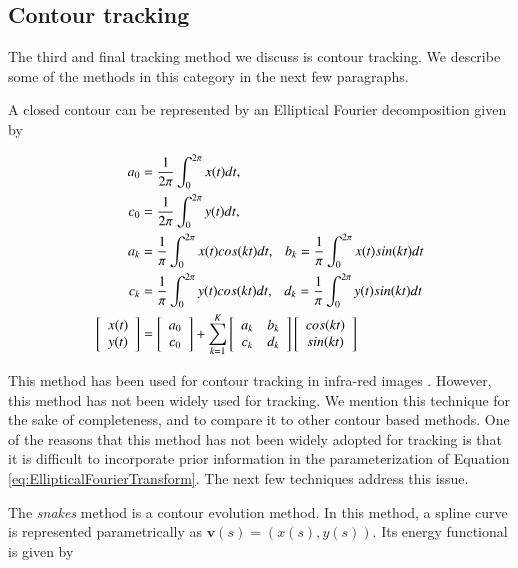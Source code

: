 \begin{Body}
\subsection{Contour tracking}
The third and final tracking method we discuss is contour tracking.  We describe some of the methods in this category in the next few paragraphs.

A closed contour can be represented by an Elliptical Fourier decomposition \cite{1982_JNL_EllipticalFourier_Kuhl} given by

\begin{align}
\centering
	\label{eq:EllipticalFourierTransform}
	a_0&=\frac{1}{2\pi}\int_0^{2 \pi}x(t)dt,       \notag\\ 
	c_0&=\frac{1}{2\pi}\int_0^{2 \pi}y(t)dt,       \notag\\ 
	a_k&=\frac{1}{\pi}\int_0^{2 \pi}x(t)cos(kt)dt,   \ \ \   b_k=\frac{1}{\pi}\int_0^{2 \pi}x(t)sin(kt)dt    \notag\\
	c_k&=\frac{1}{\pi}\int_0^{2 \pi}y(t)cos(kt)dt,    \ \ \  d_k=\frac{1}{\pi}\int_0^{2 \pi}y(t)sin(kt)dt    \notag\\
	\left[ \begin{array}{ccc}x(t) \\y(t) \end{array}\right] &=\left[ \begin{array}{ccc}a_0\\c_0 \end{array}\right] + \sum_{k=1}^K \left[ \begin{array}{ccc}a_k & b_k\\c_k & d_k \end{array}\right]\left[ \begin{array}{ccc}cos(kt)\\sin(kt) \end{array}\right]
\end{align}

This method has been used for contour tracking in infra-red images \cite{2010_CNF_VehicleContour_Aslam}.  However, this method has not been widely used for tracking.  We mention this technique for the sake of completeness, and to compare it to other contour based methods.  One of the reasons that this method has not been widely adopted for tracking is that it is difficult to incorporate prior information in the parameterization of Equation \ref{eq:EllipticalFourierTransform}.  The next few techniques address this issue.

The \emph{snakes} method \cite{1988_JNL_Snakes_Kass} is a contour evolution method.  In this method, a spline curve is represented parametrically as $\mathbf{v}(s) = (x(s), y(s))$.  Its energy functional is given by


\end{Body}
